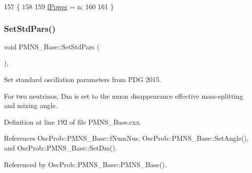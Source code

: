 \begin{DoxyCode}
157 \{
158 
159   \hyperlink{classOscProb_1_1PMNS__Deco_a19fdcdf9a8b2bd9677f72ca1fd77dc3e}{fPower} = n;
160   
161 \}
\end{DoxyCode}
\mbox{\label{classOscProb_1_1PMNS__Base_a4de96ac9b6d1e9b029ab877e57d211ad}} 
\subsubsection{\texorpdfstring{Set\+Std\+Pars()}{SetStdPars()}}
{\footnotesize\ttfamily void P\+M\+N\+S\+\_\+\+Base\+::\+Set\+Std\+Pars (\begin{DoxyParamCaption}{ }\end{DoxyParamCaption})\hspace{0.3cm}{\ttfamily [virtual]}, {\ttfamily [inherited]}}

Set standard oscillation parameters from P\+DG 2015.

For two neutrinos, Dm is set to the muon disappearance effective mass-\/splitting and mixing angle. 

Definition at line 192 of file P\+M\+N\+S\+\_\+\+Base.\+cxx.



References Osc\+Prob\+::\+P\+M\+N\+S\+\_\+\+Base\+::f\+Num\+Nus, Osc\+Prob\+::\+P\+M\+N\+S\+\_\+\+Base\+::\+Set\+Angle(), and Osc\+Prob\+::\+P\+M\+N\+S\+\_\+\+Base\+::\+Set\+Dm().



Referenced by Osc\+Prob\+::\+P\+M\+N\+S\+\_\+\+Base\+::\+P\+M\+N\+S\+\_\+\+Base().


